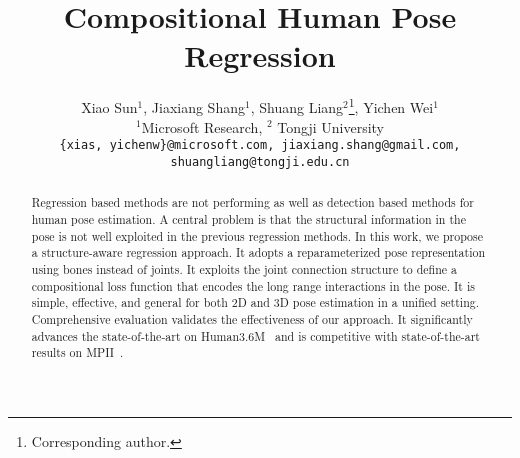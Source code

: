 \documentclass[10pt,twocolumn,letterpaper]{article}
\begin{document}
\title{Compositional Human Pose Regression}


{
\author{Xiao Sun$^1$, Jiaxiang Shang$^1$, Shuang Liang$^2$\thanks{Corresponding author.}, Yichen Wei$^1$ \\
$^1$Microsoft Research, $^2$ Tongji University\\
	{\tt\small  \{xias, yichenw\}@microsoft.com, jiaxiang.shang@gmail.com, shuangliang@tongji.edu.cn}
}
}

\maketitle


\begin{abstract}
Regression based methods are not performing as well as detection based methods for human pose estimation. A central problem is that the structural information in the pose is not well exploited in the previous regression methods. In this work, we propose a structure-aware regression approach. It adopts a reparameterized pose representation using bones instead of joints. It exploits the joint connection structure to define a compositional loss function that encodes the long range interactions in the pose. It is simple, effective, and general for both 2D and 3D pose estimation in a unified setting. Comprehensive evaluation validates the effectiveness of our approach. It significantly advances the state-of-the-art on Human3.6M~\cite{ionescu2014human3} and is competitive with state-of-the-art results on MPII~\cite{andriluka20142d}.
\end{abstract}
\end{document}
